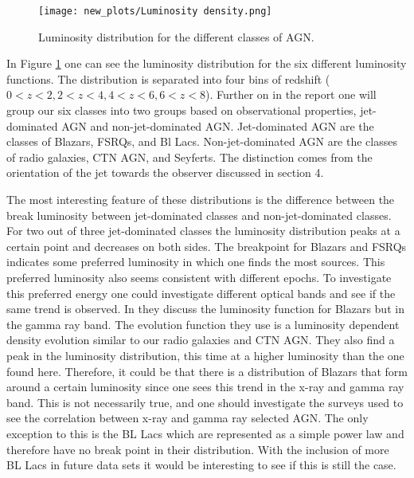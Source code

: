\begin{figure}
    \centering
    \texttt{[image: new\_plots/Luminosity density.png]}
    \caption{Luminosity distribution for the  different classes of AGN.}
    \label{fig:LD}
\end{figure}


In Figure \ref{fig:LD} one can see the luminosity distribution for the six different luminosity functions. The distribution is 
separated into four bins of redshift ($0<z<2,2<z<4,4<z<6,6<z<8$). 
Further on in the report one will group our six classes into two groups based on observational properties, jet-dominated AGN and non-jet-dominated AGN. Jet-dominated AGN are the classes of Blazars, FSRQs, and Bl Lacs. Non-jet-dominated AGN are the classes of radio galaxies, CTN AGN, and Seyferts.
The distinction comes from the orientation of the jet towards the observer discussed in section 4. 

%
The most interesting feature of these distributions is the difference between the break luminosity between jet-dominated classes and non-jet-dominated classes. 
For two out of three jet-dominated classes  the luminosity distribution peaks at a certain point and decreases on both sides.  %
The breakpoint for Blazars and FSRQs indicates some preferred 
luminosity in which one finds the most sources. This preferred luminosity also seems consistent with different epochs. To investigate this preferred energy one could investigate different optical bands and see if the same trend is observed. 
In \cite{Narumoto_2006} they discuss the luminosity function for Blazars but in the gamma ray band. The evolution function they use is a luminosity dependent density evolution similar to our radio galaxies and CTN AGN. They also find a peak in the luminosity distribution, this time at a higher luminosity than the one found here.
Therefore, it could be that there is a distribution of Blazars that form around a certain luminosity since one sees this trend in the x-ray and gamma ray band. 
This is not necessarily true, and one should investigate the surveys used to see the correlation between x-ray and gamma ray selected AGN.
The only exception to this is the BL Lacs which are represented as a simple power law and therefore have no
break point in their distribution. With the inclusion of more BL Lacs in future data sets it would be interesting to see if this is still the case.

